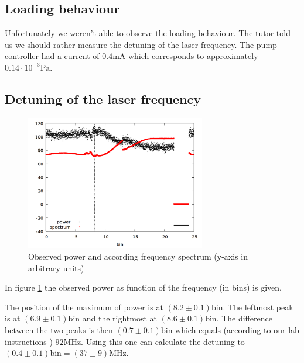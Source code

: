 \subsection{Loading behaviour}
Unfortunately we weren't able to observe the loading behaviour. The tutor told us we should rather measure the detuning of the laser frequency. The pump controller had a current of $0.4 \si{\milli\ampere}$ which corresponds to approximately $0.14 \cdot 10^{-3} \si{\pascal}$.

\subsection{Detuning of the laser frequency}

\begin{figure}
\centering
\includegraphics[width=0.7\textwidth]{data/oszi.png}
\caption{Observed power and according frequency spectrum (y-axis in arbitrary units)}
\label{fig:oszi}
\end{figure}

In figure \ref{fig:oszi} the observed power as function of the frequency (in bins) is given.

The position of the maximum of power is at $(8.2 \pm 0.1) \mathrm{bin}$. The leftmost peak is at $(6.9 \pm 0.1) \mathrm{bin}$ and the rightmost at $(8.6 \pm 0.1) \mathrm{bin}$. The difference between the two peaks is then $(0.7 \pm 0.1) \mathrm{bin}$ which equals (according to our lab instructions \cite{material_tutor}) $92 \si{\mega \hertz}$. Using this one can calculate the detuning to $(0.4 \pm 0.1) \mathrm{bin} = (37 \pm 9)\si{\mega \hertz}$. 

